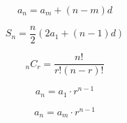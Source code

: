 \[\begin{equation} \label{Arithmetic Formula with n&m} a_{n}=a_{m}+(n-m)d \end{equation}\]

\[\begin{equation} \label{Arithmetic Sum for Finite} S_{n}=\frac{n}{2}(2a_{1}+(n-1)d) \end{equation}\]

\[\begin{equation} \label{Combinations Calculation} _{n}C_{r}=\frac{n!}{r!(n-r)!} \end{equation}\]

\[\begin{equation} \label{Geometric Formula with a1} a_{n}=a_{1}\cdot r^{n-1} \end{equation}\]

\[\begin{equation} \label{Geometric Formula with n&m} a_{n}=a_{m}\cdot r^{n-1} \end{equation}\]
